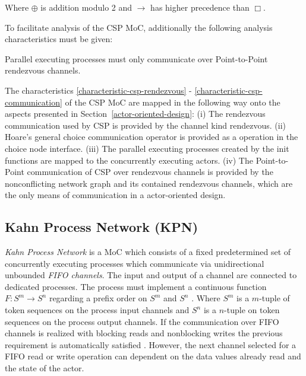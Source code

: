 Where $\oplus$ is addition modulo 2 and $\to$ has higher precedence than $\Box$.

To facilitate analysis of the CSP MoC, additionally the following
analysis characteristics must be given:
\begin{characteristic}\label{characteristic-csp-communication}
  Parallel executing processes must only communicate over Point-to-Point rendezvous channels.
\end{characteristic}

The characteristics \ref{characteristic-csp-rendezvous} -
\ref{characteristic-csp-communication} of the CSP MoC are mapped in the following way
onto the aspects presented in Section~\ref{actor-oriented-design}:
(i) The rendezvous communication %
used by CSP is provided by the channel kind rendezvous. %
(ii) Hoare's general choice communication operator %
is provided as a operation in the choice node interface. %
(iii) The parallel executing processes %
created by the init functions are mapped to the concurrently executing actors.
(iv) The Point-to-Point communication of CSP over rendezvous channels %
is provided by the nonconflicting network graph %
and its contained rendezvous channels, which are the only means of communication in a
actor-oriented design.

\subsection{Kahn Process Network (KPN)}
\emph{Kahn Process Network} \cite{kahn:1974} is a MoC
which consists of a fixed predetermined set of
concurrently executing processes which communicate via unidirectional
unbounded \emph{FIFO channels}. The input and output of a channel
are connected to dedicated processes. The process must implement
a continuous function $F: S^m \to S^n$ regarding a prefix order on
$S^m$ and $S^n$ \cite{kahn:1974,stark87concurrent:1987}.
Where $S^m$ is a $m$-tuple of token sequences on the process input channels
and $S^n$ is a $n$-tuple on token sequences on the process output channels.
If the communication over FIFO channels is realized with blocking
reads and nonblocking writes the previous requirement is automatically
satisfied \cite{stark87concurrent:1987}. However, the next channel
selected for a FIFO read or write operation can dependent on
the data values already read and the state of the actor.


